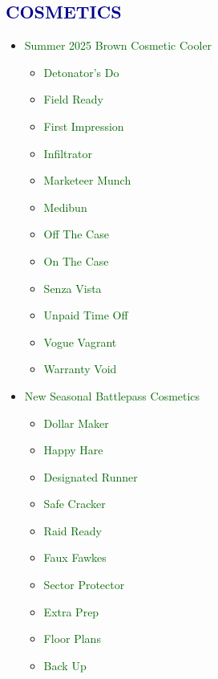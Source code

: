 \documentclass{article}
\begin{document}
\subsection*{\textcolor{darkblue}{COSMETICS}}

\begin{itemize}
    \item \textcolor{darkgreen}{Summer 2025 Brown Cosmetic Cooler}
    \begin{itemize}
        \item \textcolor{darkgreen}{Detonator’s Do}
        \item \textcolor{darkgreen}{Field Ready}
        \item \textcolor{darkgreen}{First Impression}
        \item \textcolor{darkgreen}{Infiltrator}
        \item \textcolor{darkgreen}{Marketeer Munch}
        \item \textcolor{darkgreen}{Medibun}
        \item \textcolor{darkgreen}{Off The Case}
        \item \textcolor{darkgreen}{On The Case}
        \item \textcolor{darkgreen}{Senza Vista}
        \item \textcolor{darkgreen}{Unpaid Time Off}
        \item \textcolor{darkgreen}{Vogue Vagrant}
        \item \textcolor{darkgreen}{Warranty Void}
    \end{itemize}
    \item \textcolor{darkgreen}{New Seasonal Battlepass Cosmetics}
    \begin{itemize}
        \item \textcolor{darkgreen}{Dollar Maker}
        \item \textcolor{darkgreen}{Happy Hare}
        \item \textcolor{darkgreen}{Designated Runner}
        \item \textcolor{darkgreen}{Safe Cracker}
        \item \textcolor{darkgreen}{Raid Ready}
        \item \textcolor{darkgreen}{Faux Fawkes}
        \item \textcolor{darkgreen}{Sector Protector}
        \item \textcolor{darkgreen}{Extra Prep}
        \item \textcolor{darkgreen}{Floor Plans}
        \item \textcolor{darkgreen}{Back Up}

\end{itemize}
\end{itemize}
\end{document}
